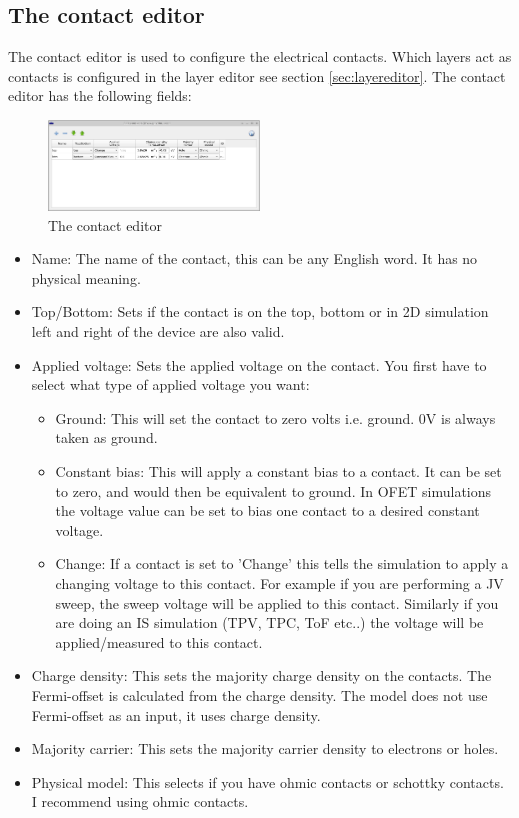\newpage
\subsection{The contact editor}
\label{sec:contacteditor}
The contact editor is used to configure the electrical contacts.  Which layers act as contacts is configured in the layer editor see section \ref{sec:layereditor}.  The contact editor has the following fields:

\begin{figure}[H]
\centering
\includegraphics[width=0.5\textwidth,height=0.3\textwidth]{./images/running/contact_editor.png}
\caption{The contact editor}
\label{fig:contacteditor}
\end{figure}

\begin{itemize}
  \item Name: The name of the contact, this can be any English word. It has no physical meaning.
  \item Top/Bottom: Sets if the contact is on the top, bottom or in 2D simulation left and right of the device are also valid.
  \item Applied voltage: Sets the applied voltage on the contact. You first have to select what type of applied voltage you want:
		\begin{itemize}
		\item Ground: This will set the contact to zero volts i.e. ground. 0V is always taken as ground.
		\item Constant bias: This will apply a constant bias to a contact.  It can be set to zero, and would then be equivalent to ground.  In OFET simulations the voltage value can be set to bias one contact to a desired constant voltage.
		\item Change: If a contact is set to 'Change' this tells the simulation to apply a changing voltage to this contact. For example if you are performing a JV sweep, the sweep voltage will be applied to this contact.  Similarly if you are doing an IS simulation (TPV, TPC, ToF etc..) the voltage will be applied/measured to this contact.
		\end{itemize}
  \item Charge density: This sets the majority charge density on the contacts. The Fermi-offset is calculated from the charge density. The model does not use Fermi-offset as an input, it uses charge density.
  \item Majority carrier: This sets the majority carrier density to electrons or holes.
  \item Physical model: This selects if you have ohmic contacts or schottky contacts. I recommend using ohmic contacts.

\end{itemize}

